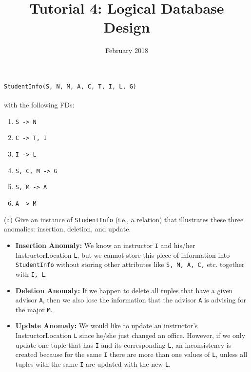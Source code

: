 \documentclass{article}
\title{Tutorial 4: Logical Database Design}
\date{February 2018}
\begin{document}
	\maketitle
	\texttt{StudentInfo(S, N, M, A, C, T, I, L, G)}\\
	\\
	with the following FDs:
	\begin{enumerate}
		\item \texttt{S -> N}
		\item \texttt{C -> T, I}
		\item \texttt{I -> L}
		\item \texttt{S, C, M -> G}
		\item \texttt{S, M -> A}
		\item \texttt{A -> M}
	\end{enumerate}
	
\noindent (a) Give an instance of \texttt{StudentInfo} (i.e., a relation) that illustrates these three anomalies: insertion, deletion, and update.\\
\begin{itemize}
	\item \textbf{Insertion Anomaly:} We know an instructor \texttt{I} and his/her InstructorLocation \texttt{L}, but we cannot store this piece of information into \texttt{StudentInfo} without storing other attributes like \texttt{S, M, A, C,} etc. together with \texttt{I, L}.
	
	\item \textbf{Deletion Anomaly:} If we happen to delete all tuples that have a given advisor \texttt{A}, then we also lose the information that the advisor \texttt{A} is advising for the major \texttt{M}.
	
	\item \textbf{Update Anomaly:} We would like to update an instructor's InstructorLocation \texttt{L} since he/she just changed an office. However, if we only update one tuple that has \texttt{I} and its corresponding \texttt{L}, an inconsistency is created because for the same \texttt{I} there are more than one values of \texttt{L}, unless all tuples with the same \texttt{I} are updated with the new \texttt{L}.
\end{itemize}
\end{document}
